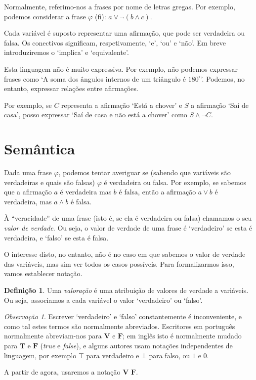 \documentclass{article}
\theoremstyle{definition}
\newtheorem{definicao}{Definição}
\theoremstyle{remark}
\newtheorem{obs}{Observação}
\newcommand{\V}{\mathbf{V}}
\newcommand{\F}{\mathbf{F}}
\begin{document}
	Normalmente, referimo-nos a frases por nome de letras gregas. Por exemplo, podemos considerar a frase $\varphi$ (fi): $a \lor \neg(b \land c)$.
	
	Cada variável é suposto representar uma afirmação, que pode ser verdadeira ou falsa. Os conectivos significam, respetivamente, `e', `ou' e `não'. Em breve introduziremos o `implica' e `equivalente'.
	
	Esta linguagem não é muito expressiva. Por exemplo, não podemos expressar frases como `A soma dos ângulos internos de um triângulo é $180^\circ$'. Podemos, no entanto, expressar relações entre afirmações.
	
	Por exemplo, se $C$ representa a afirmação `Está a chover' e $S$ a afirmação `Saí de casa', posso expressar `Saí de casa e não está a chover' como $S \land \neg C$.
	
	\section{Semântica}
	
	Dada uma frase $\varphi$, podemos tentar averiguar se (sabendo que variáveis são verdadeiras e quais são falsas) $\varphi$ é verdadeira ou falsa. Por exemplo, se sabemos que a afirmação $a$ é verdadeira mas $b$ é falsa, então a afirmação $a \lor b$ é verdadeira, mas $a \land b$ é falsa.
	
	À ``veracidade'' de uma frase (isto é, se ela é verdadeira ou falsa) chamamos o seu \emph{valor de verdade}. Ou seja, o valor de verdade de uma frase é `verdadeiro' se esta é verdadeira, e `falso' se esta é falsa.
	
	O interesse disto, no entanto, não é no caso em que sabemos o valor de verdade das variáveis, mas sim ver todos os casos possíveis. Para formalizarmos isso, vamos establecer notação.
	
	\begin{definicao}
	Uma \emph{valoração} é uma atribuição de valores de verdade a variáveis. Ou seja, associamos a cada variável o valor `verdadeiro' ou `falso'.
	\end{definicao}
	
	\begin{obs}
	Escrever `verdadeiro' e `falso' constantemente é inconveniente, e como tal estes termos são normalmente abreviados. Escritores em português normalmente abreviam-nos para $\V$ e $\F$; em inglês isto é normalmente mudado para $\mathbf{T}$ e $\mathbf{F}$ (\textit{true} e \textit{false}), e alguns autores usam notações independentes de linguagem, por exemplo $\top$ para verdadeiro e $\bot$ para falso, ou $1$ e $0$.
	
	A partir de agora, usaremos a notação $\V$ $\F$.
	\end{obs}
	
\end{document}
